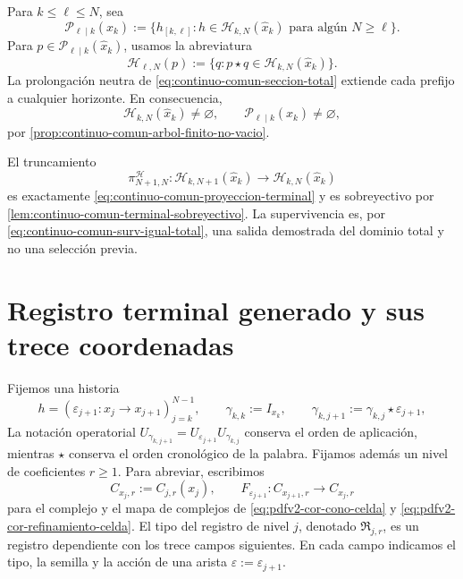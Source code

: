Para \(k\leq\ell\leq N\), sea
\begin{equation}
\label{eq:pdfv2-terminal-prefijos-intermedios}
 \mathscr P_{\ell\mid k}(\widehat x_k)
 :=\{h_{[k,\ell]}:h\in\mathscr H_{k,N}(\widehat x_k)
       \text{ para alg\'un }N\geq\ell\}.
\end{equation}
Para \(p\in\mathscr P_{\ell\mid k}(\widehat x_k)\), usamos la abreviatura
\begin{equation}
\label{eq:pdfv2-terminal-continuaciones-prefijo}
 \mathscr H_{\ell,N}(p)
 :=\{q:p\star q\in\mathscr H_{k,N}(\widehat x_k)\}.
\end{equation}
La prolongaci\'on neutra de \eqref{eq:continuo-comun-seccion-total} extiende
cada prefijo a cualquier horizonte. En consecuencia,
\begin{equation}
\label{eq:pdfv2-terminal-no-vacuidad-historias}
 \mathscr H_{k,N}(\widehat x_k)\neq\varnothing,
 \qquad
 \mathscr P_{\ell\mid k}(\widehat x_k)\neq\varnothing,
\end{equation}
por \cref{prop:continuo-comun-arbol-finito-no-vacio}.

El truncamiento
\begin{equation}
\label{eq:pdfv2-terminal-truncamiento-historias}
 \pi_{N+1,N}^{\mathscr H}:
 \mathscr H_{k,N+1}(\widehat x_k)
 \longrightarrow\mathscr H_{k,N}(\widehat x_k)
\end{equation}
es exactamente \eqref{eq:continuo-comun-proyeccion-terminal} y es
sobreyectivo por \cref{lem:continuo-comun-terminal-sobreyectivo}. La
supervivencia es, por
\eqref{eq:continuo-comun-surv-igual-total}, una salida demostrada del dominio
total y no una selecci\'on previa.

\section{Registro terminal generado y sus trece coordenadas}

Fijemos una historia
\[
 h=(\varepsilon_{j+1}:x_j\longrightarrow x_{j+1})_{j=k}^{N-1},
 \qquad
 \gamma_{k,k}:=I_{x_k},\qquad
 \gamma_{k,j+1}:=\gamma_{k,j}\star\varepsilon_{j+1},
\]
La notación operatorial
\(U_{\gamma_{k,j+1}}
=U_{\varepsilon_{j+1}}U_{\gamma_{k,j}}\) conserva el orden de aplicación,
mientras \(\star\) conserva el orden cronológico de la palabra. Fijamos
además un nivel de coeficientes \(r\geq1\). Para abreviar, escribimos
\[
 C_{x_j,r}:=C_{j,r}(x_j),\qquad
 F_{\varepsilon_{j+1}}:C_{x_{j+1},r}\longrightarrow C_{x_j,r}
\]
para el complejo y el mapa de complejos de
\eqref{eq:pdfv2-cor-cono-celda} y
\eqref{eq:pdfv2-cor-refinamiento-celda}. El tipo del registro de nivel
\(j\), denotado \(\mathfrak R_{j,r}\), es un registro dependiente con los
trece campos siguientes. En cada campo indicamos el tipo, la semilla y la
acción de una arista \(\varepsilon:=\varepsilon_{j+1}\).

